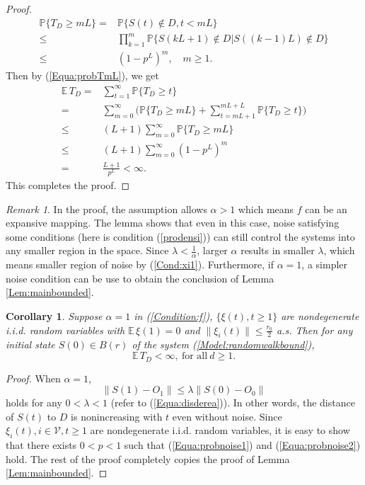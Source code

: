 \documentclass[11pt]{article}
\newtheorem{cor}[thm]{Corollary}
\theoremstyle{definition}
\theoremstyle{remark}
\newtheorem{rem}[thm]{Remark}
\numberwithin{equation}{section}
\begin{document}
\begin{proof}
\begin{equation}\label{Equa:probTmL}
\begin{split}
  \mathbb{P}\{T_D\geq mL\}=& \mathbb{P}\{S(t)\notin D, t< mL\}\\
\leq&\prod\limits_{k=1}^{m}\mathbb{P}\{S(kL+1)\notin D|S((k-1)L)\notin D\}\\
  \leq& (1-p^{L})^m, \quad m\geq 1.
  \end{split}
\end{equation}
Then by (\ref{Equa:probTmL}), we get
\begin{equation*}
\begin{split}
  \mathbb{E}\,T_D=&\sum\limits_{t=1}^\infty\mathbb{P}\{T_D\geq t\}\\
  =&\sum\limits_{m=0}^\infty\bigg(\mathbb{P}\{T_D\geq mL\}+\sum\limits_{t=mL+1}^{mL+L}\mathbb{P}\{T_D\geq t\}\bigg)\\
  \leq&(L+1)\sum\limits_{m=0}^\infty\mathbb{P}\{T_D\geq mL\}\\
  \leq &(L+1)\sum\limits_{m=0}^\infty(1-p^L)^m\\
  =&\frac{L+1}{p^{L}}<\infty.
  \end{split}
\end{equation*}
This completes the proof.
\end{proof}

\begin{rem}
In the proof, the assumption allows $\alpha>1$ which means $f$ can be an expansive mapping. The lemma shows that even in this case, noise satisfying some conditions (here is condition (\ref{prodensi})) can still control the systems into any smaller region in the space. Since $\lambda<\frac{1}{\alpha}$, larger $\alpha$ results in smaller $\lambda$, which means smaller region of noise by (\ref{Cond:xi1}). Furthermore, if $\alpha=1$, a simpler noise condition can be use to obtain the conclusion of Lemma \ref{Lem:mainbounded}.
\end{rem}
\begin{cor}\label{Cor:syninboundspace}
Suppose $\alpha=1$ in (\ref{Condition:f}), $\{\xi(t), t\geq 1\}$ are nondegenerate i.i.d. random variables with $\mathbb{E}\,\xi(1)=0$ and $\|\xi_i(t)\|\leq \frac{r_0}{2}$ a.s. Then for any initial state $S(0)\in B(r)$ of the system (\ref{Model:randomwalkbound}),
\begin{equation*}
 \mathbb{E}\,T_D<\infty, ~\text{for all}~ d\geq 1.
\end{equation*}
\end{cor}
\begin{proof}
When $\alpha=1$,
\begin{equation*}
  \| S(1)-O_1\|\leq \lambda\| S(0)-O_0\|
\end{equation*}
holds for any $0<\lambda<1$ (refer to (\ref{Equa:disderea})). In other words, the distance of $S(t)$ to $D$ is nonincreasing with $t$ even without noise. Since $\xi_i(t), i\in\mathcal{V}, t\geq 1$ are nondegenerate i.i.d. random variables, it is easy to show that there exists $0<p<1$ such that (\ref{Equa:probnoise1}) and (\ref{Equa:probnoise2}) hold. The rest of the proof completely copies the proof of Lemma \ref{Lem:mainbounded}.
\end{proof}
\end{document}
